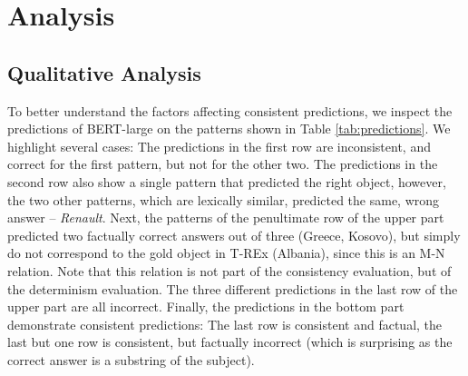 \section{Analysis}
\label{sec:analysis}








\subsection{Qualitative Analysis}
To better understand the factors affecting consistent
predictions, we inspect the predictions of BERT-large on the
patterns shown  in Table \ref{tab:predictions}.
We highlight several cases:
The predictions in the first row are inconsistent, and
correct for the first pattern, but not for the other two. 
The predictions in the second row also show a single pattern that predicted the right object, however, the two other patterns, which are lexically similar, predicted the same, wrong answer -- \textit{Renault}.
Next, the patterns of the penultimate row of the upper part
predicted two factually correct answers out of three
(Greece, Kosovo), but simply do not correspond to the gold
object in T-REx (Albania), since this is an M-N
relation. Note that this relation is not part of the
consistency evaluation, but of the determinism evaluation.
The three different predictions in
the last row of the upper part are all incorrect.
Finally, the predictions in the bottom part demonstrate
consistent predictions:
The last row  is consistent and factual, the last but one
row is consistent, but factually incorrect (which is
surprising as the correct answer is a substring of the subject).





